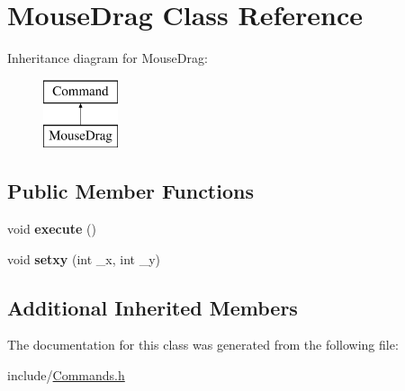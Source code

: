 \hypertarget{classMouseDrag}{\section{Mouse\-Drag Class Reference}
\label{classMouseDrag}
}
Inheritance diagram for Mouse\-Drag\-:\begin{figure}[H]
\begin{center}
\leavevmode
\includegraphics[height=2.000000cm]{classMouseDrag}
\end{center}
\end{figure}
\subsection*{Public Member Functions}
\begin{DoxyCompactItemize}
\item 
\hypertarget{classMouseDrag_a0548eb683710e0d6cfc97089b9083446}{void {\bfseries execute} ()}\label{classMouseDrag_a0548eb683710e0d6cfc97089b9083446}

\item 
\hypertarget{classMouseDrag_ab5be48af508bd4056c10751bb22abdfe}{void {\bfseries setxy} (int \-\_\-x, int \-\_\-y)}\label{classMouseDrag_ab5be48af508bd4056c10751bb22abdfe}

\end{DoxyCompactItemize}
\subsection*{Additional Inherited Members}


The documentation for this class was generated from the following file\-:\begin{DoxyCompactItemize}
\item 
include/\hyperlink{Commands_8h}{Commands.\-h}\end{DoxyCompactItemize}
